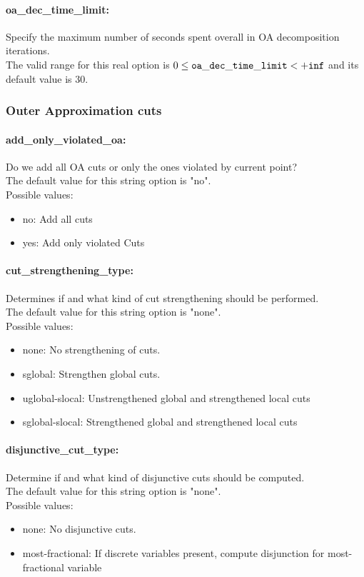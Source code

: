 \paragraph{oa\_dec\_time\_limit:} Specify the maximum number of seconds spent overall in OA decomposition iterations. $\;$ \\
 The valid range for this real option is 
$0 \le {\tt oa\_dec\_time\_limit } <  {\tt +inf}$
and its default value is $30$.


\subsubsection{Outer Approximation cuts}
\label{sec:bonmin_options_:_Outer_Approximation_cuts}
\paragraph{add\_only\_violated\_oa:} Do we add all OA cuts or only the ones violated by current point? $\;$ \\
The default value for this string option is "no".
\\ 
Possible values:
\begin{itemize}
   \item no: Add all cuts
   \item yes: Add only violated Cuts
\end{itemize}

\paragraph{cut\_strengthening\_type:} Determines if and what kind of cut strengthening should be performed. $\;$ \\
The default value for this string option is "none".
\\ 
Possible values:
\begin{itemize}
   \item none: No strengthening of cuts.
   \item sglobal: Strengthen global cuts.
   \item uglobal-slocal: Unstrengthened global and strengthened local
cuts
   \item sglobal-slocal: Strengthened global and strengthened local cuts
\end{itemize}

\paragraph{disjunctive\_cut\_type:} Determine if and what kind of disjunctive cuts should be computed. $\;$ \\
The default value for this string option is "none".
\\ 
Possible values:
\begin{itemize}
   \item none: No disjunctive cuts.
   \item most-fractional: If discrete variables present, compute
disjunction for most-fractional variable
\end{itemize}

